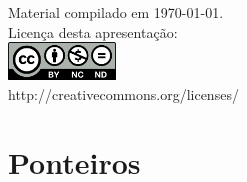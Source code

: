 \documentclass[portuguese,10pt,xcolor=table]{bredelebeamer}
\title{\insertlecture}
\author{Prof. Fernando Figueira\\(adaptado do material do Prof. Rafael Beserra Gomes)}
\institute{UFRN}
\subtitle{Introdução}
\date{}
\begin{document}
\begin{frame}
  \maketitle
 \begin{center}
 \tiny
Material compilado em \today.\\
  Licença desta apresentação:\\
		\includegraphics[height=1.0cm]{by-nc-nd.png}\\
http://creativecommons.org/licenses/
	\end{center}
\end{frame}

	\def\GN[#1]{\colorbox{gray!40}{#1}}
	\def\RN[#1]{\colorbox{red!40}{#1}}
	\def\BN[#1]{\colorbox{blue!40}{#1}}
	\def\RBN[#1]{\cellcolor{blue!40}{ #1 }}
	\def\RON[#1]{\cellcolor{orange!40}{ #1 }}
	\def\ON[#1]{\colorbox{orange!40}{#1}}
	\def\WN[#1]{\colorbox{white!40}{#1}}
	\def\GZ[#1]{\colorbox{gray!40}{\textbf{#1}}}
	\def\BZ[#1]{\colorbox{blue!40}{\textbf{#1}}}

\section{Ponteiros}
	
	\begin{frame}
		\begin{center}
		\end{center}
	\end{frame} 
\end{document}
